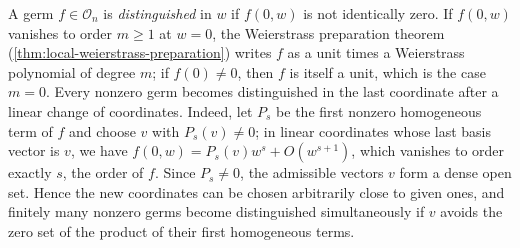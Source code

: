 A germ $f\in\mathcal O_n$ is \emph{distinguished} in $w$ if $f(0,w)$ is not identically zero. If $f(0,w)$ vanishes to order $m\geq1$ at $w=0$, the Weierstrass preparation theorem (\cref{thm:local-weierstrass-preparation}) writes $f$ as a unit times a Weierstrass polynomial of degree $m$; if $f(0)\neq0$, then $f$ is itself a unit, which is the case $m=0$. Every nonzero germ becomes distinguished in the last coordinate after a linear change of coordinates. Indeed, let $P_s$ be the first nonzero homogeneous term of $f$ and choose $v$ with $P_s(v)\neq0$; in linear coordinates whose last basis vector is $v$, we have $f(0,w)=P_s(v)w^s+O(w^{s+1})$, which vanishes to order exactly $s$, the order of $f$. Since $P_s\neq0$, the admissible vectors $v$ form a dense open set. Hence the new coordinates can be chosen arbitrarily close to given ones, and finitely many nonzero germs become distinguished simultaneously if $v$ avoids the zero set of the product of their first homogeneous terms.

